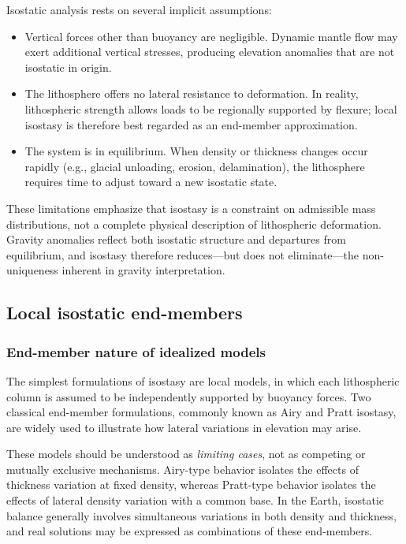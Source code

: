 Isostatic analysis rests on several implicit assumptions:
\begin{itemize}
    \item Vertical forces other than buoyancy are negligible.
    Dynamic mantle flow may exert additional vertical stresses, producing elevation anomalies that are not isostatic in origin.
    \item The lithosphere offers no lateral resistance to deformation.
    In reality, lithospheric strength allows loads to be regionally supported by flexure; local isostasy is therefore best regarded as an end-member approximation.
    \item The system is in equilibrium.
    When density or thickness changes occur rapidly (e.g., glacial unloading, erosion, delamination), the lithosphere requires time to adjust toward a new isostatic state.
\end{itemize}

These limitations emphasize that isostasy is a constraint on admissible mass distributions, not a complete physical description of lithospheric deformation.
Gravity anomalies reflect both isostatic structure and departures from equilibrium, and isostasy therefore reduces—but does not eliminate—the non-uniqueness inherent in gravity interpretation.

\subsection{Local isostatic end-members}

\subsubsection{End-member nature of idealized models}

The simplest formulations of isostasy are local models, in which each lithospheric column is assumed to be independently supported by buoyancy forces.  Two classical end-member formulations, commonly known as Airy and Pratt isostasy, are widely used to illustrate how lateral variations in elevation may arise.

These models should be understood as \emph{limiting cases}, not as competing or mutually exclusive mechanisms.  Airy-type behavior isolates the effects of thickness variation at fixed density, whereas Pratt-type behavior isolates the effects of lateral density variation with a common base.  In the Earth, isostatic balance generally involves simultaneous variations in both density and thickness, and real solutions may be expressed as combinations of these end-members.

